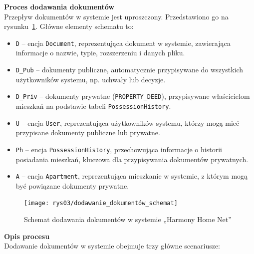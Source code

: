 
\noindent \textbf{Proces dodawania dokumentów}\\
Przepływ dokumentów w systemie jest uproszczony. Przedstawiono go na rysunku~\ref{fig:document_schema}. Główne elementy schematu to:

\begin{itemize}
    \item \texttt{D} -- encja \texttt{Document}, reprezentująca dokument w systemie, zawierająca informacje o nazwie, typie, rozszerzeniu i danych pliku.
    \item \texttt{D\_Pub} -- dokumenty publiczne, automatycznie przypisywane do wszystkich użytkowników systemu, np. uchwały lub decyzje.
    \item \texttt{D\_Priv} -- dokumenty prywatne (\texttt{PROPERTY\_DEED}), przypisywane właścicielom mieszkań na podstawie tabeli \texttt{PossessionHistory}.
    \item \texttt{U} -- encja \texttt{User}, reprezentująca użytkowników systemu, którzy mogą mieć przypisane dokumenty publiczne lub prywatne.
    \item \texttt{Ph} -- encja \texttt{PossessionHistory}, przechowująca informacje o historii posiadania mieszkań, kluczowa dla przypisywania dokumentów prywatnych.
    \item \texttt{A} -- encja \texttt{Apartment}, reprezentująca mieszkanie w systemie, z którym mogą być powiązane dokumenty prywatne.
\end{itemize}

\begin{figure}[ht]
    \centering
    \texttt{[image: rys03/dodawanie\_dokumentów\_schemat]}
    \caption{Schemat dodawania dokumentów w systemie „Harmony Home Net”}
    \label{fig:document_schema}
\end{figure}

\noindent \textbf{Opis procesu}\\
Dodawanie dokumentów w systemie obejmuje trzy główne scenariusze:

